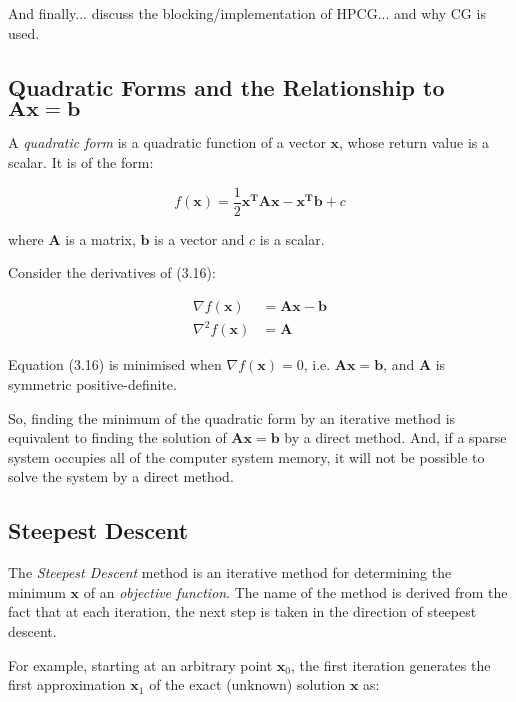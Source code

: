 And finally... discuss the blocking/implementation of HPCG... and why CG is used. 

%
%
\subsection{Quadratic Forms and the Relationship to $\mathbf{A}\mathbf{x}=\mathbf{b}$}

A \emph{quadratic form} is a quadratic function of a vector $\mathbf{x}$, whose return value is a scalar. It is of the form:

\begin{equation}
f(\mathbf{x}) = \frac{1}{2}\mathbf{x}^{\mathbf{T}}\mathbf{A}\mathbf{x} - \mathbf{x}^{\mathbf{T}}\mathbf{b} + c
\end{equation}

where $\mathbf{A}$ is a matrix, $\mathbf{b}$ is a vector and $c$ is a scalar.

Consider the derivatives of (3.16):

\begin{equation}
\begin{split}
\nabla f(\mathbf{x}) &= \mathbf{A}\mathbf{x} - \mathbf{b} \\
\nabla^2 f(\mathbf{x}) &= \mathbf{A}
\end{split}
\end{equation}

Equation (3.16) is minimised when $\nabla f(\mathbf{x}) = 0$, i.e. $\mathbf{A}\mathbf{x} = \mathbf{b}$, and $\mathbf{A}$ is symmetric positive-definite.

So, finding the minimum of the quadratic form by an iterative method is equivalent to finding the solution of $\mathbf{A}\mathbf{x} = \mathbf{b}$ by a direct method. And, if a sparse system occupies all of the computer system memory, it will not be possible to solve the system by a direct method.


%
%
\subsection{Steepest Descent}

The \emph{Steepest Descent} method is an iterative method for determining the minimum $\mathbf{x}$ of an \emph{objective function}. The name of the method is derived from the fact that at each iteration, the next step is taken in the direction of steepest descent.

For example, starting at an arbitrary point $\mathbf{x}_0$, the first iteration generates the first approximation $\mathbf{x}_1$ of the exact (unknown) solution $\mathbf{x}$ as:


